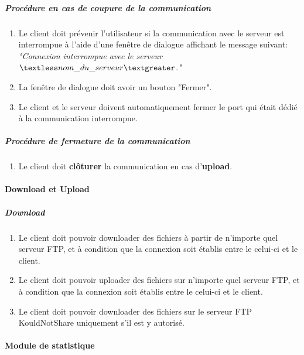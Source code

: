 \documentclass[10pt,a4paper]{report}
\begin{document}
	\subparagraph{Procédure en cas de coupure de la communication}

		\begin{enumerate}
			\item Le client doit prévenir l'utilisateur si la communication avec le serveur est interrompue à l'aide d'une fenêtre de dialogue affichant le message suivant:\\
\textit{"Connexion interrompue avec le serveur $\textless nom\_du\_serveur\textgreater$."}

			\item La fenêtre de dialogue doit avoir un bouton "Fermer".

			\item Le client et le serveur doivent automatiquement fermer le port qui était dédié à la communication interrompue.
		\end{enumerate}
		
	\subparagraph{Procédure de fermeture de la communication}

		\begin{enumerate}
			\item Le client doit \textbf{clôturer} la communication en cas d'\textbf{upload}. 
		\end{enumerate}
		
\paragraph{Download et Upload}

	\subparagraph{Download}
	
		\begin{enumerate}
			\item Le client doit pouvoir downloader des fichiers à partir de n'importe quel serveur FTP, et à condition que la connexion soit établis entre le celui-ci et le client.
			\item Le client doit pouvoir uploader des fichiers sur n'importe quel serveur FTP, et à condition que la connexion soit établis entre le celui-ci et le client.
			\item Le client doit pouvoir downloader des fichiers sur le serveur FTP KouldNotShare uniquement s'il est y autorisé.
		\end{enumerate}
		
\paragraph{Module de statistique}
\end{document}
